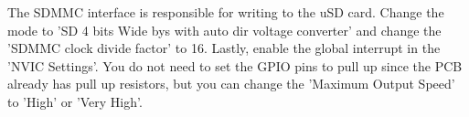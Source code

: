 The SDMMC interface is responsible for writing to the uSD card. Change the mode to 'SD 4 bits Wide bys with auto dir voltage converter' and change the 'SDMMC clock divide factor' to 16.
Lastly, enable the global interrupt in the 'NVIC Settings'.
You do not need to set the GPIO pins to pull up since the PCB already has pull up resistors, but you can change the 'Maximum Output Speed' to 'High' or 'Very High'.